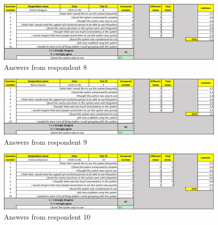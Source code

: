 \documentclass[12pt]{article}
\begin{document}
    \begin{figure}[H]
        \centering
        \includegraphics[width=\linewidth]{Pictures/Usertest_8.JPG}
        \caption{Answers from respondent 8}
        \label{fig:Usertest_8}
    \end{figure}
    \begin{figure}[H]
        \centering
        \includegraphics[width=\linewidth]{Pictures/Usertest_9.JPG}
        \caption{Answers from respondent 9}
        \label{fig:Usertest_9}
    \end{figure}
    \begin{figure}[H]
        \centering
        \includegraphics[width=\linewidth]{Pictures/Usertest_10.JPG}
        \caption{Answers from respondent 10}
        \label{fig:Usertest_10}
    \end{figure}
\end{document}
